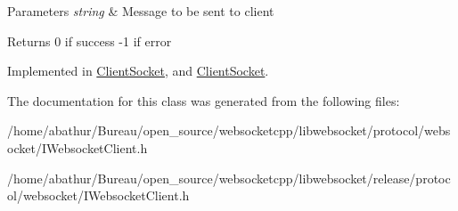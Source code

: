 \begin{DoxyParams}{Parameters}
{\em string} & Message to be sent to client \\
\hline
\end{DoxyParams}
\begin{DoxyReturn}{Returns}
0 if success -\/1 if error 
\end{DoxyReturn}


Implemented in \hyperlink{class_client_socket_ae2e6b6a4536c986b54d5db1902e11ce8}{Client\-Socket}, and \hyperlink{class_client_socket_ae2e6b6a4536c986b54d5db1902e11ce8}{Client\-Socket}.



The documentation for this class was generated from the following files\-:\begin{DoxyCompactItemize}
\item 
/home/abathur/\-Bureau/open\-\_\-source/websocketcpp/libwebsocket/protocol/websocket/I\-Websocket\-Client.\-h\item 
/home/abathur/\-Bureau/open\-\_\-source/websocketcpp/libwebsocket/release/protocol/websocket/I\-Websocket\-Client.\-h\end{DoxyCompactItemize}
